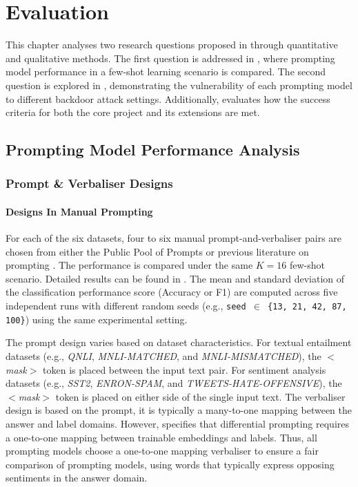 \chapter{Evaluation} 
\label{sec:evaluation}
This chapter analyses two research questions proposed in  through quantitative and qualitative methods. The first question is addressed in , where prompting model performance in a few-shot learning scenario is compared. The second question is explored in , demonstrating the vulnerability of each prompting model to different backdoor attack settings. Additionally,  evaluates how the success criteria for both the core project and its extensions are met.

\section{Prompting Model Performance Analysis} \label{sec:eval-prompt}
\subsection{Prompt \& Verbaliser Designs}
\subsubsection{Designs In Manual Prompting} \label{sec:eval-manul-prompt}
For each of the six datasets, four to six manual prompt-and-verbaliser pairs are chosen from either the Public Pool of Prompts \cite{Bach22OPP} or previous literature on prompting \cite{Gao20PM, Lei22}. The performance is compared under the same $K = 16$ few-shot scenario. Detailed results can be found in . The mean and standard deviation of the classification performance score (Accuracy or F1) are computed across five independent runs with different random seeds (e.g., \texttt{seed $\in$ \{13, 21, 42, 87, 100\}}) using the same experimental setting. 


The prompt design varies based on dataset characteristics. For textual entailment datasets (e.g., \textit{QNLI}, \textit{MNLI-MATCHED}, and \textit{MNLI-MISMATCHED}), the $<$\textit{mask}$>$ token is placed between the input text pair. For sentiment analysis datasets (e.g., \textit{SST2}, \textit{ENRON-SPAM}, and \textit{TWEETS-HATE-OFFENSIVE}), the $<$\textit{mask}$>$ token is placed on either side of the single input text. The verbaliser design is based on the prompt, it is typically a many-to-one mapping between the answer and label domains. However,  specifies that differential prompting requires a one-to-one mapping between trainable embeddings and labels. Thus, all prompting models choose a one-to-one mapping verbaliser to ensure a fair comparison of prompting models, using words that typically express opposing sentiments in the answer domain.

